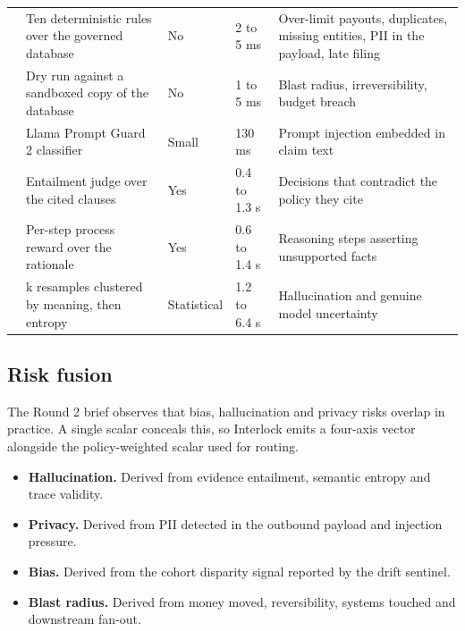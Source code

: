 \documentclass[10pt]{article}
\begin{document}
\vspace{2pt}
{\small
\begin{xltabular}{\textwidth}{@{}L{0.175\textwidth}L{0.215\textwidth}L{0.075\textwidth}R{0.115\textwidth}Y@{}}
\toprule
{} &  &  &  &  \\
\midrule
{} & Ten deterministic rules over the governed database & \textcolor{ok}{No} & 2 to 5 ms & Over-limit payouts, duplicates, missing entities, PII in the payload, late filing \\
 & Dry run against a sandboxed copy of the database & \textcolor{ok}{No} & 1 to 5 ms & Blast radius, irreversibility, budget breach \\
 & Llama Prompt Guard 2 classifier & Small & 130 ms & Prompt injection embedded in claim text \\
 & Entailment judge over the cited clauses & Yes & 0.4 to 1.3 s & Decisions that contradict the policy they cite \\
 & Per-step process reward over the rationale & Yes & 0.6 to 1.4 s & Reasoning steps asserting unsupported facts \\
 & k resamples clustered by meaning, then entropy & Statistical & 1.2 to 6.4 s & Hallucination and genuine model uncertainty \\
\bottomrule
\end{xltabular}}

\subsection{Risk fusion}

The Round 2 brief observes that bias, hallucination and privacy risks overlap in
practice. A single scalar conceals this, so Interlock emits a four-axis vector alongside
the policy-weighted scalar used for routing.

\begin{itemize}
\item \textbf{Hallucination.} Derived from evidence entailment, semantic entropy and trace validity.
\item \textbf{Privacy.} Derived from PII detected in the outbound payload and injection pressure.
\item \textbf{Bias.} Derived from the cohort disparity signal reported by the drift sentinel.
\item \textbf{Blast radius.} Derived from money moved, reversibility, systems touched and downstream fan-out.
\end{itemize}
\end{document}

